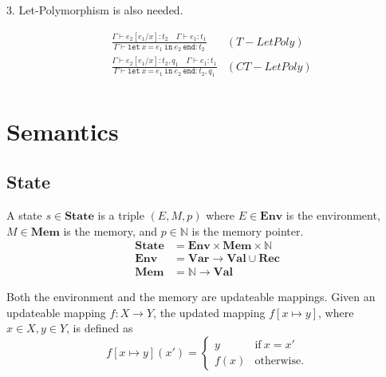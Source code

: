 \documentclass{article}
\begin{document}
3. Let-Polymorphism is also needed.

\begin{align*}
	&\frac{\Gamma \vdash e_2[e_1/x]:t_2 \quad \Gamma \vdash e_1:t_1}
	{\Gamma\vdash \texttt{let}\ x\ \texttt{=}\ e_1\ \texttt{in}\ e_2\ \texttt{end} : t_2} &(T-LetPoly)\\
	&\frac{\Gamma \vdash e_2[e_1/x]:t_2,q_1 \quad \Gamma \vdash e_1:t_1}
	{\Gamma\vdash \texttt{let}\ x\ \texttt{=}\ e_1\ \texttt{in}\ e_2\ \texttt{end} : t_2, q_1}&(CT-LetPoly)\\
\end{align*}
\newpage

\section{Semantics}

\subsection{State}

A state $s\in\mathbf{State}$ is a triple $(E,M,p)$ where
$E\in\mathbf{Env}$ is the environment,
$M\in\mathbf{Mem}$ is the memory, and
$p\in\mathbb{N}$ is the memory pointer.
\begin{align*}
\mathbf{State} &= \mathbf{Env} \times \mathbf{Mem} \times \mathbb{N} \\
  \mathbf{Env} &= \mathbf{Var} \rightarrow \mathbf{Val}\cup\mathbf{Rec} \\
  \mathbf{Mem} &= \mathbb{N} \rightarrow \mathbf{Val}
\end{align*}

Both the environment and the memory are updateable mappings.
Given an updateable mapping $f:X\rightarrow Y$, the updated mapping $f[x\mapsto y]$,
where $x\in X, y\in Y$, is defined as \[f[x\mapsto y](x') = \begin{cases}
  y & \text{if}\ x=x' \\
  f(x) & \text{otherwise.}
\end{cases}\]
\end{document}
